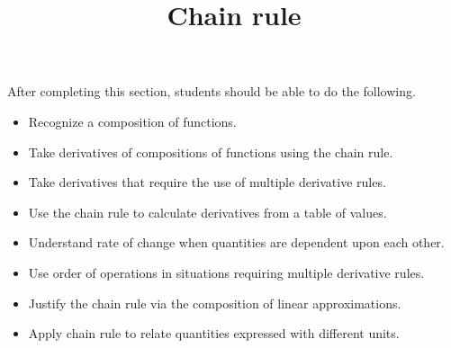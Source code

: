 \documentclass{ximera}
\title{Chain rule}
\begin{document}
\begin{abstract}
\end{abstract}

\maketitle

\begin{sectionOutcomes}

After completing this section, students should be able to do the following.

\begin{itemize}
	\item Recognize a composition of functions.
	\item Take derivatives of compositions of functions using the chain rule.
	\item Take derivatives that require the use of multiple derivative rules.
	\item Use the chain rule to calculate derivatives from a table of values.
	\item Understand rate of change when quantities are dependent upon each other.
	\item Use order of operations in situations requiring multiple derivative rules.
        \item Justify the chain rule via the composition of linear approximations.
        \item Apply chain rule to relate quantities expressed with different units.
\end{itemize}

\end{sectionOutcomes}
\end{document}
